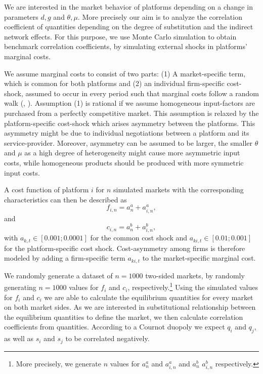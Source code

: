 \documentclass[12pt,a4paper]{scrreprt}
\begin{document}
We are interested in the market behavior of platforms depending on a change in parameters $d, g$ and $\theta, \mu$. More precisely our aim is to analyze the correlation coefficient of quantities depending on the degree of substitution and the indirect network effects. For this purpose, we use Monte Carlo simulation to obtain benchmark correlation coefficients, by simulating external shocks in platforms' marginal costs. 

We assume marginal costs to consist of two parts: (1) A market-specific term, which is common for both platforms and (2) an individual firm-specific cost-shock, assumed to occur in every period such that marginal costs follow a random walk (\cite[241]{harrington_detecting_2008}, \cite{paha_empirical_2011}). Assumption (1) is rational if we assume homogeneous input-factors are purchased from a perfectly competitive market. This assumption is relaxed by the platform-specific cost-shock which arises asymmetry between the platforms. This asymmetry might be due to individual negotiations between a platform and its service-provider. Moreover, asymmetry can be assumed to be larger, the smaller $\theta$ and $\mu$ as a high degree of heterogeneity might cause more asymmetric input costs, while homogeneous products should be produced with more symmetric input costs. 


A cost function of platform $i$ for $n$ simulated markets with the corresponding characteristics can then be described as
\begin{equation}
f_{i,n} = a^a_n+a^a_{i,n},
\end{equation} and 
\begin{equation}
c_{i,n} = a^b_n+a^b_{i,n},
\end{equation}
with $a_{k,t} \in [0.001;0.0001]$ for the common cost shock and $a_{ki,t} \in [0.01;0.001] $ for the platform-specific cost shock. Cost-asymmetry among firms is therefore modeled by adding a firm-specific term $a_{ki,t}$ to the market-specific marginal cost. 

We randomly generate a dataset of $n=1000$ two-sided markets, by randomly generating $n=1000$ values for $f_i$ and $c_i$, respectively.\footnote{More precisely, we generate $n$ values for $a^a_n$ and $a^a_{i,n}$ and $a^b_n$ $a^b_{i,n}$ respectively.} Using the simulated values for $f_i$ and $c_i$ we are able to calculate the equilibrium quantities for every market on both market sides. As we are interested in substitutional relationship between the equilibrium quantities to define the market, we then calculate correlation coefficients from quantities. According to a Cournot duopoly we expect $q_i$ and $q_j$, as well as $s_i$ and $s_j$ to be correlated negatively. 
\end{document}
